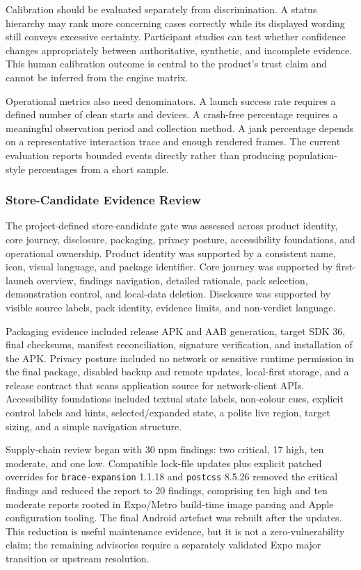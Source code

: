 Calibration should be evaluated separately from discrimination. A status hierarchy may rank more concerning cases correctly while its displayed wording still conveys excessive certainty. Participant studies can test whether confidence changes appropriately between authoritative, synthetic, and incomplete evidence. This human calibration outcome is central to the product's trust claim and cannot be inferred from the engine matrix.

Operational metrics also need denominators. A launch success rate requires a defined number of clean starts and devices. A crash-free percentage requires a meaningful observation period and collection method. A jank percentage depends on a representative interaction trace and enough rendered frames. The current evaluation reports bounded events directly rather than producing population-style percentages from a short sample.

\subsubsection{Store-Candidate Evidence Review}

The project-defined store-candidate gate was assessed across product identity, core journey, disclosure, packaging, privacy posture, accessibility foundations, and operational ownership. Product identity was supported by a consistent name, icon, visual language, and package identifier. Core journey was supported by first-launch overview, findings navigation, detailed rationale, pack selection, demonstration control, and local-data deletion. Disclosure was supported by visible source labels, pack identity, evidence limits, and non-verdict language.

Packaging evidence included release APK and AAB generation, target SDK 36, final checksums, manifest reconciliation, signature verification, and installation of the APK. Privacy posture included no network or sensitive runtime permission in the final package, disabled backup and remote updates, local-first storage, and a release contract that scans application source for network-client APIs. Accessibility foundations included textual state labels, non-colour cues, explicit control labels and hints, selected/expanded state, a polite live region, target sizing, and a simple navigation structure.

Supply-chain review began with 30 npm findings: two critical, 17 high, ten moderate, and one low. Compatible lock-file updates plus explicit patched overrides for \texttt{brace-expansion} 1.1.18 and \texttt{postcss} 8.5.26 removed the critical findings and reduced the report to 20 findings, comprising ten high and ten moderate reports rooted in Expo/Metro build-time image parsing and Apple configuration tooling. The final Android artefact was rebuilt after the updates. This reduction is useful maintenance evidence, but it is not a zero-vulnerability claim; the remaining advisories require a separately validated Expo major transition or upstream resolution.


